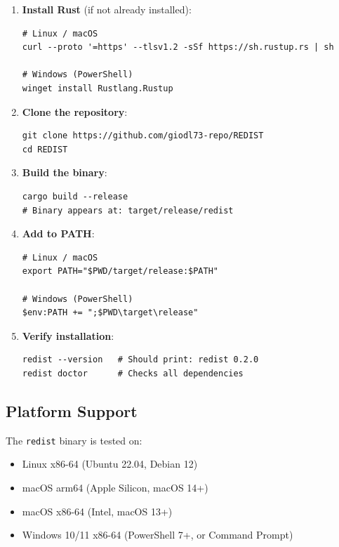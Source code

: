 \begin{enumerate}[leftmargin=*, itemsep=4pt]

  \item \textbf{Install Rust} (if not already installed):
\begin{verbatim}
# Linux / macOS
curl --proto '=https' --tlsv1.2 -sSf https://sh.rustup.rs | sh

# Windows (PowerShell)
winget install Rustlang.Rustup
\end{verbatim}

  \item \textbf{Clone the repository}:
\begin{verbatim}
git clone https://github.com/giodl73-repo/REDIST
cd REDIST
\end{verbatim}

  \item \textbf{Build the binary}:
\begin{verbatim}
cargo build --release
# Binary appears at: target/release/redist
\end{verbatim}

  \item \textbf{Add to PATH}:
\begin{verbatim}
# Linux / macOS
export PATH="$PWD/target/release:$PATH"

# Windows (PowerShell)
$env:PATH += ";$PWD\target\release"
\end{verbatim}

  \item \textbf{Verify installation}:
\begin{verbatim}
redist --version   # Should print: redist 0.2.0
redist doctor      # Checks all dependencies
\end{verbatim}

\end{enumerate}

\subsection*{Platform Support}

The \texttt{redist} binary is tested on:
\begin{itemize}[itemsep=2pt]
  \item Linux x86-64 (Ubuntu 22.04, Debian 12)
  \item macOS arm64 (Apple Silicon, macOS 14+)
  \item macOS x86-64 (Intel, macOS 13+)
  \item Windows 10/11 x86-64 (PowerShell 7+, or Command Prompt)
\end{itemize}

